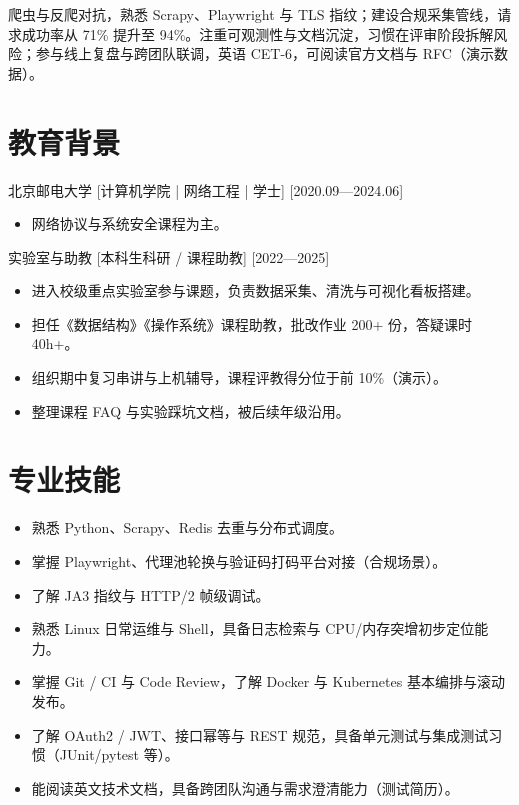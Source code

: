 \documentclass{resume-photo}
\begin{document}

\ResumeTitle

\noindent 爬虫与反爬对抗，熟悉 Scrapy、Playwright 与 TLS 指纹；建设合规采集管线，请求成功率从 71\% 提升至 94\%。注重可观测性与文档沉淀，习惯在评审阶段拆解风险；参与线上复盘与跨团队联调，英语 CET-6，可阅读官方文档与 RFC（演示数据）。

\section{教育背景}
\ResumeItem
{北京邮电大学}
[\textnormal{计算机学院 | 网络工程 | 学士}]
[2020.09—2024.06]

\begin{itemize}
  \item 网络协议与系统安全课程为主。
\end{itemize}


\ResumeItem
{实验室与助教}
[\textnormal{本科生科研 / 课程助教}]
[2022—2025]

\begin{itemize}
  \item 进入校级重点实验室参与课题，负责数据采集、清洗与可视化看板搭建。
  \item 担任《数据结构》《操作系统》课程助教，批改作业 200+ 份，答疑课时 40h+。
  \item 组织期中复习串讲与上机辅导，课程评教得分位于前 10\%（演示）。
  \item 整理课程 FAQ 与实验踩坑文档，被后续年级沿用。
\end{itemize}



\section{专业技能}
\begin{itemize}
  \item 熟悉 Python、Scrapy、Redis 去重与分布式调度。
  \item 掌握 Playwright、代理池轮换与验证码打码平台对接（合规场景）。
  \item 了解 JA3 指纹与 HTTP/2 帧级调试。
  \item 熟悉 Linux 日常运维与 Shell，具备日志检索与 CPU/内存突增初步定位能力。
  \item 掌握 Git / CI 与 Code Review，了解 Docker 与 Kubernetes 基本编排与滚动发布。
  \item 了解 OAuth2 / JWT、接口幂等与 REST 规范，具备单元测试与集成测试习惯（JUnit/pytest 等）。
  \item 能阅读英文技术文档，具备跨团队沟通与需求澄清能力（测试简历）。
\end{itemize}
\end{document}
